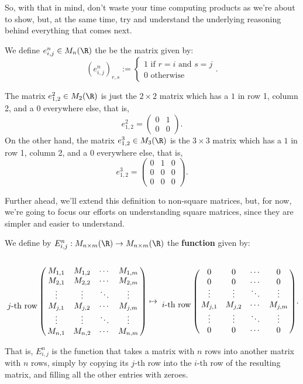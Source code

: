 So, with that in mind, don't waste your time computing products as we're about to show, but, at the same time, try and understand the underlying reasoning behind everything that comes next.

\bigskip
\begin{df}
	We define $e_{i,j}^n\in M_n(\R)$ the be the matrix given by:
	\[(e_{i,j}^n)_{r,s}:=\begin{cases}
	1\text{ if } r=i \text{ and } s=j\\
	0\text{ otherwise }
	\end{cases}.\]
\end{df}

\begin{ex}
	The matrix $e^2_{1,2}\in M_{2}(\R)$ is just the $2\times 2$ matrix which has a $1$ in row 1, column 2, and a $0$ everywhere else, that is,\[e^2_{1,2}=\begin{pmatrix}
	0 & 1\\
	0 & 0
	\end{pmatrix}.\] On the other hand, the matrix $e^3_{1,2}\in M_3(\R)$ is the $3\times 3$ matrix which has a $1$ in row 1, column 2, and a $0$ everywhere else, that is, \[e^3_{1,2}=\begin{pmatrix}
	0 & 1&0\\
	0 & 0&0\\
	0&0&0
	\end{pmatrix}.\]
\end{ex}

Further ahead, we'll extend this definition to non-square matrices, but, for now, we're going to focus our efforts on understanding square matrices, since they are simpler and easier to understand.

\begin{df}
	We define by $E^n_{i,j}:M_{n\times m}(\R)\to M_{n\times m}(\R)$ the \textbf{function} given by:
	\[\bordermatrix{&&&&\cr
		&M_{1,1} & M_{1,2} & \cdots & M_{1,m}\cr
		& M_{2,1}& M_{2,2} & \cdots & M_{2,m}\cr
		& \vdots & \vdots & \ddots & \vdots\cr		
		j\text{-th row}& M_{j,1} & M_{j,2} & \cdots & M_{j,m}\cr
		& \vdots & \vdots & \ddots & \vdots\cr
		&M_{n,1} & M_{n,2} & \cdots & M_{n,m}	
	}\mapsto
	\bordermatrix{
	&&&&\cr
	&0&0&\cdots&0\cr
	&0&0&\cdots&0\cr
	& \vdots & \vdots & \ddots & \vdots\cr
	i\text{-th row}& M_{j,1} & M_{j,2} & \cdots & M_{j,m}\cr
	& \vdots & \vdots & \ddots & \vdots\cr
	&0&0&\cdots&0
	}.
	\]
\end{df}

That is, $E^n_{i,j}$ is the function that takes a matrix with $n$ rows into another matrix with $n$ rows, simply by copying its $j$-th row into the $i$-th row of the resulting matrix, and filling all the other entries with zeroes.

